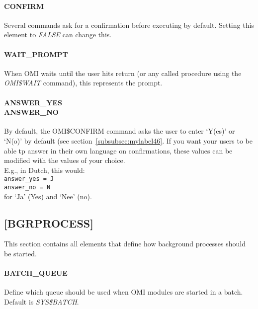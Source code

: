\documentclass[a4paper]{book}
\renewcommand{\indent}{\hspace*{5mm}}
\begin{document}
\paragraph{CONFIRM}
\label{para:confirmput}

Several commands ask for a confirmation
before executing by default. Setting this element to \textsl{FALSE} can change this.

\paragraph{WAIT{\_}PROMPT}

When OMI waits until the user hits return (or any called procedure using the 
\textsl{OMI{\$}WAIT} command), this 
represents the prompt.

\paragraph{ANSWER{\_}YES\\ANSWER{\_}NO}

By default, the \textsf{OMI{\$}CONFIRM} command asks the user to enter `Y(es)' or `N(o)' by
default (see section~\ref{subsubsec:mylabel46}. If you want your users to be able tp
answer in their own language on confirmations, these values can be modified with the
values of your choice.\\
E.g., in Dutch, this would: \\
\indent\texttt{answer{\_}yes = J}\\
\indent\texttt{answer{\_}no = N}\\
for `Ja' (Yes) and `Nee' (no).

\subsection{[BGRPROCESS]}
\label{subsubsec:mylabel19}

This section contains all elements that define how background processes 
should be started.

\paragraph{BATCH{\_}QUEUE}

Define which queue should be used when OMI modules are started in a batch. 
Default is \textsl{SYS{\$}BATCH}.
\end{document}
